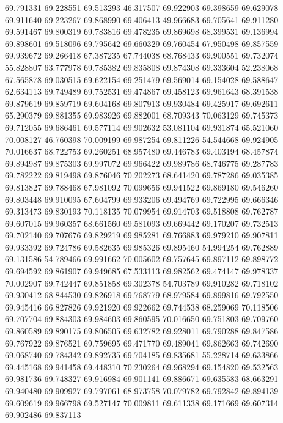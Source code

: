 69.791331
69.228551
69.513293
46.317507
69.922903
69.398659
69.629078
69.911640
69.223267
69.868990
69.406413
49.966683
69.705641
69.911280
69.591467
69.800319
69.783816
69.478235
69.869698
68.399531
69.136994
69.898601
69.518096
69.795642
69.660329
69.760454
67.950498
69.857559
69.939672
69.266418
67.387235
67.744038
68.768433
69.900551
69.732074
55.828807
63.777978
69.785382
69.835808
69.874308
69.333604
52.238068
67.565878
69.030515
69.622154
69.251479
69.569014
69.154028
69.588647
62.634113
69.749489
69.752531
69.474867
69.458123
69.961643
68.391538
69.879619
69.859719
69.604168
69.807913
69.930484
69.425917
69.692611
65.290379
69.881355
69.983926
69.882001
68.709343
70.063129
69.745373
69.712055
69.686461
69.577114
69.902632
53.081104
69.931874
65.521060
70.008127
46.760398
70.009199
69.987254
69.811226
54.544668
69.924905
70.016637
68.722753
69.260251
68.957480
69.446783
69.403194
68.457874
69.894987
69.875303
69.997072
69.966422
69.989786
68.746775
69.287783
69.782222
69.819498
69.876046
70.202273
68.641420
69.787286
69.035385
69.813827
69.788468
67.981092
70.099656
69.941522
69.869180
69.546260
69.803448
69.910095
67.604799
69.933206
69.494769
69.722995
69.666346
69.313473
69.830193
70.118135
70.079954
69.914703
69.518808
69.762787
69.607015
69.960357
68.661560
69.581093
69.669442
69.170207
69.732513
69.702140
69.707676
69.829219
69.985281
69.766883
69.979210
69.907811
69.933392
69.724786
69.582635
69.985326
69.895460
54.994254
69.762889
69.131586
54.789466
69.991662
70.005602
69.757645
69.897112
69.898772
69.694592
69.861907
69.949685
67.533113
69.982562
69.474147
69.978337
70.002907
69.742447
69.851858
69.302378
54.703789
69.910282
69.718102
69.930412
68.844530
69.826918
69.768779
68.979584
69.899816
69.792550
69.945416
66.827826
69.921920
69.922662
69.744538
68.259069
70.118506
69.707704
69.884303
69.984603
69.860595
70.016650
69.751803
69.709760
69.860589
69.890175
69.806505
69.632782
69.928011
69.790288
69.847586
69.767922
69.876521
69.759695
69.471770
69.489041
69.862663
69.742690
69.068740
69.784342
69.892735
69.704185
69.835681
55.228714
69.633866
69.445168
69.941458
69.448310
70.230264
69.968294
69.154820
69.532563
69.981736
69.748327
69.916984
69.901141
69.886671
69.635583
68.663291
69.940480
69.909927
69.797061
68.973758
70.079782
69.792842
69.894139
69.609619
69.966798
69.527147
70.009811
69.611338
69.171669
69.607314
69.902486
69.837113
